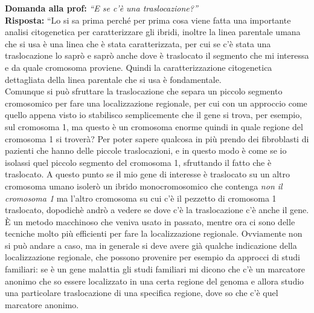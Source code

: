 \documentclass[11pt]{book}
\begin{document}
\textbf{Domanda alla prof:} \emph{``E se c’è una traslocazione?''}\\
\textbf{Risposta:} ``Lo si sa prima perché per prima cosa viene fatta una importante analisi citogenetica per caratterizzare gli ibridi, inoltre la linea parentale umana che si usa è una linea che è stata caratterizzata, per cui se c’è stata una traslocazione lo saprò e saprò anche dove è traslocato il segmento che mi interessa e da quale cromosoma proviene. Quindi la caratterizzazione citogenetica dettagliata della linea parentale che si usa è fondamentale.\\
Comunque si può sfruttare la traslocazione che separa un piccolo segmento cromosomico per fare una localizzazione regionale, per cui con un approccio come quello appena visto io stabilisco semplicemente che il gene si trova, per esempio, sul cromosoma 1, ma questo è un cromosoma enorme quindi in quale regione del cromosoma 1 si troverà? Per poter sapere qualcosa in più prendo dei fibroblasti di pazienti che hanno delle piccole traslocazioni, e in questo modo è come se io isolassi quel piccolo segmento del cromosoma 1, sfruttando il fatto che è traslocato. A questo punto se il mio gene di interesse è traslocato su un altro cromosoma umano isolerò un ibrido monocromosomico che contenga \emph{non il cromosoma 1} ma l’altro cromosoma su cui c’è il pezzetto di cromosoma 1 traslocato, dopodichè andrò a vedere se dove c’è la traslocazione c’è anche il gene. È un metodo macchinoso che veniva usato in passato, mentre ora ci sono delle tecniche molto più efficienti per fare la localizzazione regionale. Ovviamente non si può andare a caso, ma in generale si deve avere già qualche indicazione della localizzazione regionale, che possono provenire per esempio da approcci di studi familiari: se è un gene malattia gli studi familiari mi dicono che c’è un marcatore anonimo che so essere localizzato in una certa regione del genoma e allora studio una particolare traslocazione di una specifica regione, dove so che c’è quel marcatore anonimo.
\end{document}
